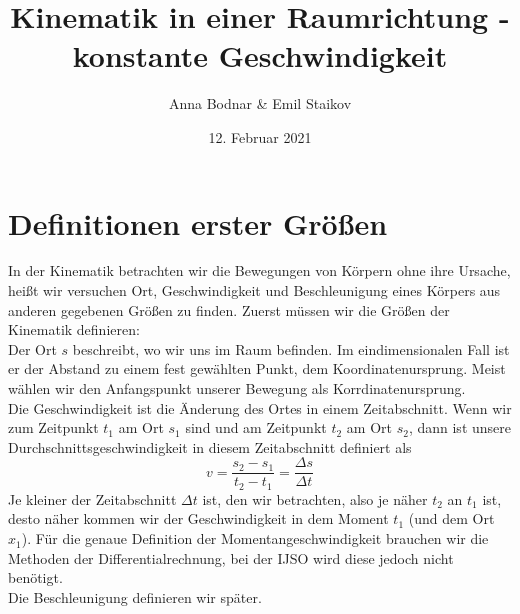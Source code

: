 \documentclass[11pt]{article}
\title{Kinematik in einer Raumrichtung - konstante Geschwindigkeit}
\author{Anna Bodnar \& Emil Staikov}
\date{12. Februar 2021}
\begin{document}
\maketitle
\section{Definitionen erster Größen}
In der Kinematik betrachten wir die Bewegungen von Körpern ohne ihre Ursache, heißt wir versuchen Ort, Geschwindigkeit und Beschleunigung eines Körpers aus anderen gegebenen Größen zu finden. Zuerst müssen wir die Größen der Kinematik definieren: \\

Der Ort $s$ beschreibt, wo wir uns im Raum befinden. Im eindimensionalen Fall ist er der Abstand zu einem fest gewählten Punkt, dem Koordinatenursprung. Meist wählen wir den Anfangspunkt unserer Bewegung als Korrdinatenursprung. \\

Die Geschwindigkeit ist die Änderung des Ortes in einem Zeitabschnitt. Wenn wir zum Zeitpunkt $t_1$ am Ort $s_1$ sind und am Zeitpunkt $t_2$ am Ort $s_2$, dann ist unsere Durchschnittsgeschwindigkeit in diesem Zeitabschnitt definiert als
$$ v = \frac{s_2-s_1}{t_2-t_1} = \frac{\Delta s}{\Delta t}$$ 
Je kleiner der Zeitabschnitt $\Delta t$ ist, den wir betrachten, also je näher $t_2$ an $t_1$ ist, desto näher kommen wir der Geschwindigkeit in dem Moment $t_1$ (und dem Ort $x_1$). Für die genaue Definition der Momentangeschwindigkeit brauchen wir die Methoden der Differentialrechnung, bei der IJSO wird diese jedoch nicht benötigt. \\

Die Beschleunigung definieren wir später. \\
\end{document}
